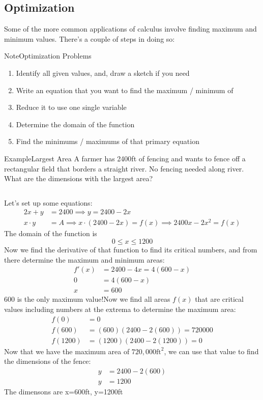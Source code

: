 \documentclass{MathNotes}
\newenvironment{example}[1]{\begin{BlueBox}{Example}{#1}}{\end{BlueBox}}
\newenvironment{note}[1]{\begin{YellowBox}{Note}{#1}}{\end{YellowBox}}
\newcommand{\bl}{
	\newline$ $\newline
}
\begin{document}
\subsection{Optimization}
Some of the more common applications of calculus involve finding maximum and
minimum values. There's a couple of steps in doing so:
\begin{note}{Optimization Problems}
	\begin{enumerate}
		\item Identify all given values, and, draw a sketch if you need
		\item Write an equation that you want to find the maximum / minimum of
		\item Reduce it to use one single variable
		\item Determine the domain of the function
		\item Find the minimums / maximums of that primary equation
	\end{enumerate}
\end{note}
\begin{example}{Largest Area}
	A farmer has 2400ft of fencing and wants to fence off a rectangular field that
	borders a straight river. No fencing needed along river. What are the dimensions
	with the largest area?
	\bl
	Let's set up some equations:
	\begin{align*}
		2x+y     & =2400\implies y=2400-2x                                 \\
		x\cdot y & =A\implies x\cdot(2400-2x)=f(x)\implies 2400x-2x^2=f(x)
	\end{align*}
	The domain of the function is $$0\leq x\leq 1200$$
	Now we find the derivative of that function to find its critical numbers, and
	from there determine the maximum and minimum areas:
	\begin{align*}
		f'(x) & =2400-4x=4(600-x) \\
		0     & =4(600-x)         \\
		x     & =600
	\end{align*}
	600 is the only maximum value!\newline Now we find all areas $f(x)$ that are
	critical values including numbers at the extrema to determine the maximum area:
	\begin{align*}
		f(0)    & =0                         \\
		f(600)  & =(600)(2400-2(600))=720000 \\
		f(1200) & =(1200)(2400-2(1200))=0
	\end{align*}
	Now that we have the maximum area of $720,000\text{ft}^2$, we can use that value to find the dimensions of the fence:
	\begin{align*}
		y & =2400-2(600) \\
		y & =1200
	\end{align*}
	The dimensons are x=600ft, y=1200ft
\end{example}
\end{document}
